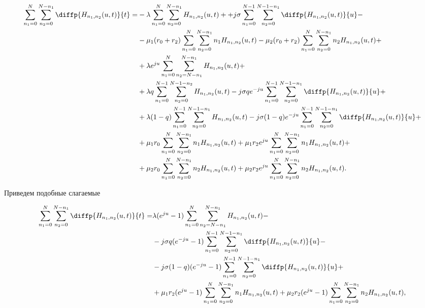 \begin{equation*}
\begin{aligned}
	\sum_{n_1=0}^N\sum_{n_2=0}^{N-n_1} \diffp{H_{n_1,n_2}(u,t)}{t}=
	&-\lambda \sum_{n_1=0}^N\sum_{n_2=0}^{N-n_1} H_{n_1, n_2}(u,t)+
	 +j\sigma \sum_{n_1=0}^{N-1}\sum_{n_2=0}^{N-1-n_1} 
	 \diffp{H_{n_1, n_2}(u,t)}{u}-\\
	&-\mu_1 (r_0+r_2) \sum_{n_1=0}^N\sum_{n_2=0}^{N-n_1} n_1 H_{n_1, n_2}(u,t)
	 -\mu_2 (r_0+r_2)\sum_{n_1=0}^N\sum_{n_2=0}^{N-n_1} n_2 H_{n_1, n_2}(u,t)+\\
	&+\lambda e^{ju}\sum_{n_1=0}^N\sum_{n_2=N-n_1}^{N-n_1} 
	  H_{n_1, n_2}(u,t)+\\
	&+\lambda q \sum_{n_1=0}^{N-1}\sum_{n_2=0}^{N-1-n_2} 
	  H_{n_1, n_2}(u,t)
	 -j \sigma q e^{-ju} \sum_{n_1=0}^{N-1}\sum_{n_2=0}^{N-1-n_1} 
	   \diffp{H_{n_1, n_2}(u,t)}{u}+\\
	&+\lambda (1-q) \sum_{n_1=0}^{N-1}\sum_{n_2=0}^{N-1-n_1} 
	  H_{n_1, n_2}(u,t) 
	 -j \sigma (1-q) e^{-ju}\sum_{n_1=0}^{N-1}\sum_{n_2=0}^{N-1-n_1} 
	  \diffp{H_{n_1, n_2}(u,t)}{u}+\\
	&+\mu_1 r_0 \sum_{n_1=0}^N\sum_{n_2=0}^{N-n_1} 
	  n_1 H_{n_1, n_2}(u,t)
	+\mu_1 r_2 e^{ju}\sum_{n_1=0}^{N}\sum_{n_2=0}^{N-n_1} 
	  n_1 H_{n_1, n_2}(u,t)+\\
	&+\mu_2 r_0 \sum_{n_1=0}^N\sum_{n_2=0}^{N-n_1} 
	  n_2 H_{n_1, n_2}(u,t)
	 +\mu_2 r_2 e^{ju}\sum_{n_1=0}^{N}\sum_{n_2=0}^{N-n_1} 
	  n_2 H_{n_1, n_2}(u,t).\\
\end{aligned}
\end{equation*}

Приведем подобные слагаемые 

\begin{equation*}
\begin{aligned}
	\sum_{n_1=0}^N\sum_{n_2=0}^{N-n_1} \diffp{H_{n_1,n_2}(u,t)}{t}=
	&\lambda (e^{ju} - 1)\sum_{n_1=0}^N\sum_{n_2=N-n_1}^{N-n_1} 
	  H_{n_1, n_2}(u,t)-\\
	&-j \sigma q (e^{-ju}-1) \sum_{n_1=0}^{N-1}\sum_{n_2=0}^{N-1-n_1} 
	   \diffp{H_{n_1, n_2}(u,t)}{u}-\\
	&-j \sigma (1-q) (e^{-ju}-1)\sum_{n_1=0}^{N-1}\sum_{n_2=0}^{N-1-n_1} 
	  \diffp{H_{n_1, n_2}(u,t)}{u}+\\
	&+\mu_1 r_2 (e^{ju} -1)\sum_{n_1=0}^{N}\sum_{n_2=0}^{N-n_1} 
	n_1 H_{n_1, n_2}(u,t)
	+\mu_2 r_2 (e^{ju} -1)\sum_{n_1=0}^{N}\sum_{n_2=0}^{N-n_1} 
	n_2 H_{n_1, n_2}(u,t),\\
\end{aligned}
\end{equation*}

